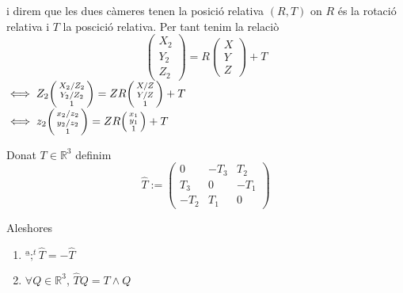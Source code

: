 \documentclass[../main.tex]{subfiles}
\begin{document}
	i direm que les dues càmeres tenen la posició relativa $(R,T)$ on $R$ és la rotació relativa i $T$ la poscició relativa.
	Per tant tenim la relaciò
	\begin{displaymath}
		\begin{pmatrix}
			X_2\\Y_2\\Z_2
		\end{pmatrix} =
		R \begin{pmatrix}
			X\\Y\\Z
			\end{pmatrix}
		+ T
	\end{displaymath}
	$\iff Z_2\begin{psmallmatrix}X_2/Z_2\\Y_2/Z_2\\1\end{psmallmatrix} = ZR\begin{psmallmatrix}X/Z\\Y/Z\\1\end{psmallmatrix} + T$\\
	$\iff z_2\begin{psmallmatrix}x_2/z_2\\y_2/z_2\\1\end{psmallmatrix} = ZR\begin{psmallmatrix}x_1\\y_1\\1\end{psmallmatrix} + T$\\
	\begin{definicio}
		Donat $T \in \mathbb{R}^3$ definim
		\begin{displaymath}
			\hat{T} := \begin{pmatrix}
				0 & -T_3 & T_2\\
				T_3 & 0 & -T_1\\
				-T_2 & T_1 & 0
				\end{pmatrix}
		\end{displaymath}
	\end{definicio}
	Aleshores
	\begin{proposicio}
		\begin{enumerate}
			\item $ª;^t\hat{T} = - \hat{T}$
			\item $\forall Q \in \mathbb{R}^3$, $\hat{T}Q = T \wedge Q$
		\end{enumerate}
	\end{proposicio}
\end{document}
